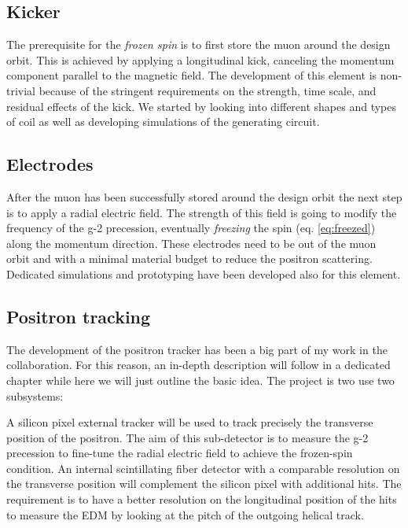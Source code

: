 \begin{refsection}
    \subsection{Kicker}
        The prerequisite for the \textit{frozen spin} is to first store the muon around the design orbit.
        This is achieved by applying a longitudinal kick, canceling the momentum component parallel to the magnetic field.
        The development of this element is non-trivial because of the stringent requirements on the strength, time scale, and residual effects of the kick.
        We started by looking into different shapes and types of coil as well as developing \ltsp simulations of the generating circuit.

    \subsection{Electrodes}
        After the muon has been successfully stored around the design orbit the next step is to apply a radial electric field. 
        The strength of this field is going to modify the frequency of the g-2 precession, eventually \textit{freezing} the spin (eq. \ref{eq:freezed}) along the momentum direction.
        These electrodes need to be out of the muon orbit and with a minimal material budget to reduce the positron scattering.  
        Dedicated simulations and prototyping have been developed also for this element.

    \subsection{Positron tracking}
        The development of the positron tracker has been a big part of my work in the collaboration.
        For this reason, an in-depth description will follow in a dedicated chapter while here we will just outline the basic idea.
        The project is two use two subsystems:
        \begin{outline}
            \1 A silicon pixel external tracker will be used to track precisely the transverse position of the positron. The aim of this sub-detector is to measure the g-2 precession to fine-tune the radial electric field to achieve the frozen-spin condition.
            \1 An internal scintillating fiber detector with a comparable resolution on the transverse position will complement the silicon pixel with additional hits. The requirement is to have a better resolution on the longitudinal position of the hits to measure the EDM by looking at the pitch of the outgoing helical track.
        \end{outline}
        

\end{refsection}
